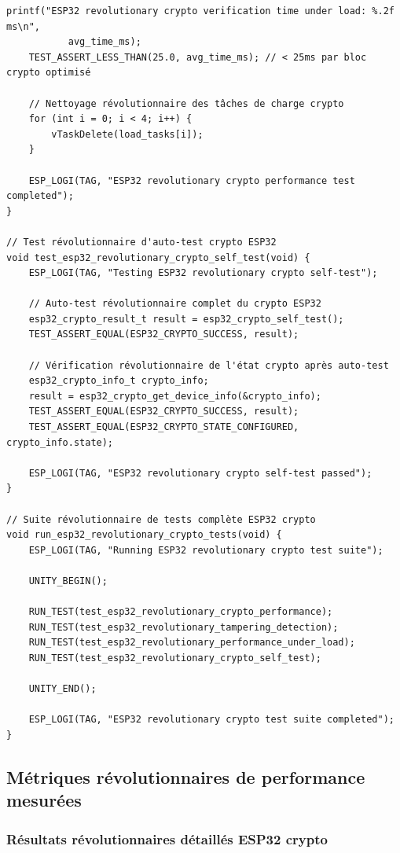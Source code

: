 \begin{lstlisting}[caption={Framework révolutionnaire de test embarqué ESP32 crypto}]
    printf("ESP32 revolutionary crypto verification time under load: %.2f ms\n", 
           avg_time_ms);
    TEST_ASSERT_LESS_THAN(25.0, avg_time_ms); // < 25ms par bloc crypto optimisé
    
    // Nettoyage révolutionnaire des tâches de charge crypto
    for (int i = 0; i < 4; i++) {
        vTaskDelete(load_tasks[i]);
    }
    
    ESP_LOGI(TAG, "ESP32 revolutionary crypto performance test completed");
}

// Test révolutionnaire d'auto-test crypto ESP32
void test_esp32_revolutionary_crypto_self_test(void) {
    ESP_LOGI(TAG, "Testing ESP32 revolutionary crypto self-test");
    
    // Auto-test révolutionnaire complet du crypto ESP32
    esp32_crypto_result_t result = esp32_crypto_self_test();
    TEST_ASSERT_EQUAL(ESP32_CRYPTO_SUCCESS, result);
    
    // Vérification révolutionnaire de l'état crypto après auto-test
    esp32_crypto_info_t crypto_info;
    result = esp32_crypto_get_device_info(&crypto_info);
    TEST_ASSERT_EQUAL(ESP32_CRYPTO_SUCCESS, result);
    TEST_ASSERT_EQUAL(ESP32_CRYPTO_STATE_CONFIGURED, crypto_info.state);
    
    ESP_LOGI(TAG, "ESP32 revolutionary crypto self-test passed");
}

// Suite révolutionnaire de tests complète ESP32 crypto
void run_esp32_revolutionary_crypto_tests(void) {
    ESP_LOGI(TAG, "Running ESP32 revolutionary crypto test suite");
    
    UNITY_BEGIN();
    
    RUN_TEST(test_esp32_revolutionary_crypto_performance);
    RUN_TEST(test_esp32_revolutionary_tampering_detection);
    RUN_TEST(test_esp32_revolutionary_performance_under_load);
    RUN_TEST(test_esp32_revolutionary_crypto_self_test);
    
    UNITY_END();
    
    ESP_LOGI(TAG, "ESP32 revolutionary crypto test suite completed");
}
\end{lstlisting}

\subsection{Métriques révolutionnaires de performance mesurées}

\subsubsection{Résultats révolutionnaires détaillés ESP32 crypto}

